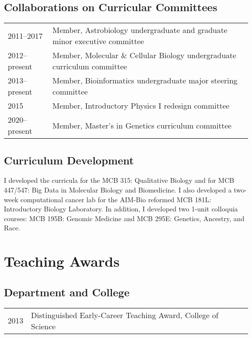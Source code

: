 \documentclass[11pt]{article}
\begin{document}

\subsection*{Collaborations on Curricular Committees}
\begin{longtable}[l]{l l}
2011--2017 & Member, Astrobiology undergraduate and graduate minor executive committee\\
2012--present& Member, Molecular \& Cellular Biology undergraduate curriculum committee\\
2013--present & Member, Bioinformatics undergraduate major steering committee\\
2015 & Member, Introductory Physics I redesign committee\\
2020--present & Member, Master's in Genetics curriculum committee
\end{longtable}

\subsection*{Curriculum Development}
I developed the curricula for the MCB 315: Qualitative Biology and for MCB 447/547: Big Data in Molecular Biology and Biomedicine. I also developed a two-week computational cancer lab for the AIM-Bio reformed MCB 181L: Introductory Biology Laboratory. In addition, I developed two 1-unit colloquia courses: MCB 195B: Genomic Medicine and MCB 295E: Genetics, Ancestry, and Race.

\section*{Teaching Awards}
\subsection*{Department and College}
\begin{longtable}[l]{l l}
2013 & Distinguished Early-Career Teaching Award, College of Science
\end{longtable}

                 
\end{document}
